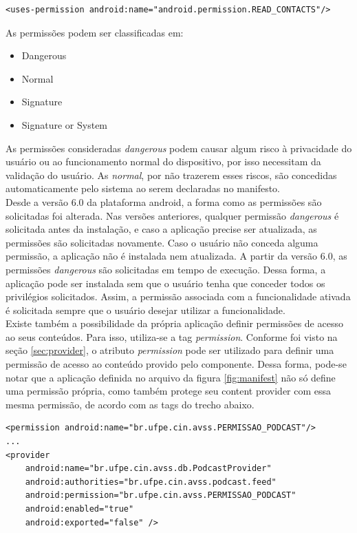 \documentclass[a4paper,12pt]{article}
\begin{document}
{\fontsize{9pt}{12pt}
\begin{verbatim}
<uses-permission android:name="android.permission.READ_CONTACTS"/>
\end{verbatim}
}

As permissões podem ser classificadas em:
\begin{itemize}
    \item {Dangerous}
    \item {Normal}
    \item {Signature}
    \item {Signature or System}
\end{itemize}

As permissões consideradas \textit{dangerous} podem causar algum risco à privacidade do usuário ou ao funcionamento normal do dispositivo, por isso necessitam da validação do usuário. As \textit{normal}, por não trazerem esses riscos, são concedidas automaticamente pelo sistema ao serem declaradas no manifesto.\\

Desde a versão 6.0 da plataforma android, a forma como as permissões são solicitadas foi alterada. Nas versões anteriores, qualquer permissão \textit{dangerous} é solicitada antes da instalação, e caso a aplicação precise ser atualizada, as permissões são solicitadas novamente. Caso o usuário não conceda alguma permissão, a aplicação não é instalada nem atualizada. A partir da versão 6.0, as permissões \textit{dangerous} são solicitadas em tempo de execução. Dessa forma, a aplicação pode ser instalada sem que o usuário tenha que conceder todos os privilégios solicitados. Assim,  a permissão associada com a funcionalidade ativada é solicitada sempre que o usuário desejar utilizar a funcionalidade.\\

Existe também a possibilidade da própria aplicação definir permissões de acesso ao seus conteúdos. Para isso, utiliza-se a tag \textit{permission}. Conforme foi visto na seção \ref{sec:provider}, o atributo \textit{permission} pode ser utilizado para definir uma permissão de acesso ao conteúdo provido pelo componente. Dessa forma, pode-se notar que a aplicação definida no arquivo da figura \ref{fig:manifest} não só define uma permissão própria, como também protege seu content provider com essa mesma permissão, de acordo com as tags do trecho abaixo.

{\fontsize{9pt}{12pt}
\begin{verbatim}
<permission android:name="br.ufpe.cin.avss.PERMISSAO_PODCAST"/>
...
<provider
    android:name="br.ufpe.cin.avss.db.PodcastProvider"
    android:authorities="br.ufpe.cin.avss.podcast.feed"
    android:permission="br.ufpe.cin.avss.PERMISSAO_PODCAST"
    android:enabled="true"
    android:exported="false" />
\end{verbatim}
}
\end{document}
